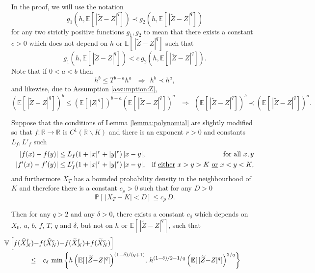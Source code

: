 \documentclass[review]{siamart190516}
\def \RR {{\mathbb{R}}}
\def \EE {{\mathbb{E}}}
\def \VV {{\mathbb{V}}}
\def \PP {{\mathbb{P}}}
\def \tZ {{\widetilde{Z}}}
\def \tXf  {{\widetilde{X}^{\rm f}}}
\def \tXc  {{\widetilde{X}^{\rm c}}}
\def \hXf {{\widehat{X}^{\rm f}}}
\def \hXc {{\widehat{X}^{\rm c}}}
\begin{document}
In the proof, we will use the notation
\[
g_1(h, \EE[\, |\tZ{-}Z|^q]) \prec g_2(h, \EE[\, |\tZ{-}Z|^q])
\]
for any two strictly positive functions $g_1, g_2$ to mean that there
exists a constant $c\!>\!0$ which does not depend on $h$ or
$\EE[\, |\tZ{-}Z|^q]$ such that
\[
g_1(h, \EE[\, |\tZ{-}Z|^q]) < c\ g_2(h, \EE[\, |\tZ{-}Z|^q]).
\]
Note that if $0\!<\!a\!<\!b$ then
\[
h^b \leq T^{b-a} h^a
~~~ \Longrightarrow~~
h^b \prec h^a,
\]
and likewise, due to Assumption \ref{assumption:Z}, 
\[
\left(\EE[\, |\tZ{-}Z|^q]\right)^b \leq 
\left(\EE[\, |Z|^q] \right)^{b-a} \left(\EE[\, |\tZ{-}Z|^q]\right)^a
~~~ \Longrightarrow~~
\left(\EE[\, |\tZ{-}Z|^q]\right)^b \prec
\left(\EE[\, |\tZ{-}Z|^q]\right)^a.
\]


\begin{lemma}
\label{lemma:polynomial_2}
Suppose that the conditions of Lemma \ref{lemma:polynomial} are slightly
modified so that $f: \RR \rightarrow \RR$ is $C^1(\RR\backslash K)$ and 
there is an exponent $r\!>\!0$ and constants $L_f, L'_f$ such
\begin{eqnarray*}
|f(x)-f(y)| \leq L_f (1+|x|^r+|y|^r)\, |x-y|, && \mbox{for all } x, y\\
|f'(x)-f'(y)| \leq L'_f (1+|x|^r+|y|^r)\, |x-y|, && 
\mbox{if \underline{either}\ } x>y>K \mbox{\ \underline{or}\ } x<y<K,
\end{eqnarray*}
and furthermore $X_T$ has a bounded probability density in the 
neighbourhood of $K$ and therefore there is a constant $c_\rho\!>\!0$
such that for any $D\!>\!0$
\[
\PP[ \, |X_T{-}K| < D ] \leq c_\rho\, D.
\]

Then for any $q\!>\!2$ and any $\delta\!>\!0$,
there exists a constant $c_\delta$ which depends on $X_0$, $a$, $b$, 
$f$, $T$, $q$ 
and $\delta$, but not on $h$ or $\EE[\, |\tZ{-}Z|^q]$, such that
\begin{eqnarray}
\lefteqn{
\hspace{-0.5in}
\VV\left[ f(\hXf_N) {-} f(\hXc_N) {-} f(\tXf_N) {+} f(\tXc_N) \right] 
}
\nonumber \\ &\leq& c_\delta \, \min\left\{ 
h \left(\EE[\, |\tZ{-}Z|^q]\right)^{(1-\delta)/(q+1)}\!,\, 
h^{(1-\delta)/2-1/q} \left(\EE[\, |\tZ{-}Z|^q]\right)^{2/q} \right \}
\label{eq:bound}
\end{eqnarray}
\end{lemma}
\end{document}
